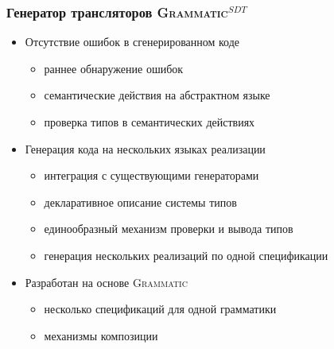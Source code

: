 \documentclass{beamer}
\newcommand{\tool}[1]{\textsc{#1}}
\newcommand{\GRM}{\textsc{Grammatic}}
\newcommand{\ATF}{\tool{Grammatic$^{SDT}$}}
\newcommand{\subtype}{\preceq}
\newcommand{\suptype}{\succeq}
\begin{document}
\begin{frame}[fragile]
	\frametitle{Генератор трансляторов \ATF{}}
	
\begin{itemize}
\item Отсутствие ошибок в сгенерированном коде
	\begin{itemize}
		\item раннее обнаружение ошибок
		\item семантические действия на абстрактном языке
		\item проверка типов в семантических действиях
	\end{itemize}
\item Генерация кода на нескольких языках реализации
	\begin{itemize}
		\item интеграция с существующими генераторами
		\item декларативное описание системы типов
		\item единообразный механизм проверки и вывода типов
		\item генерация нескольких реализаций по одной спецификации
	\end{itemize}
\item Разработан на основе \GRM{}
	\begin{itemize}
		\item несколько спецификаций для одной грамматики
		\item механизмы композиции
	\end{itemize}
\end{itemize}	
\end{frame}

\renewcommand{\L}{{}}
\newcommand{\G}{ {\mathcal{G}_\L} }
\newcommand{\eql}{\cong_\L}
\newcommand{\lel}{\subtype_\L}
\newcommand{\gel}{\suptype_\L}
\newcommand{\TUP}{TupleType}
\newcommand{\Str}{String_\L}
\end{document}
